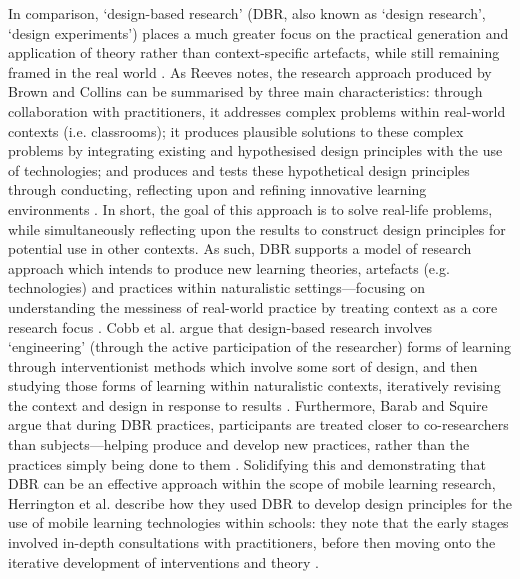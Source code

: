 In comparison, `design-based research' (DBR, also known as `design research', `design experiments') places a much greater focus on the practical generation and application of theory rather than context-specific artefacts, while still remaining framed in the real world \citep{zimmerman2007}. As Reeves notes, the research approach produced by Brown and Collins can be summarised by three main characteristics: through collaboration with practitioners, it addresses complex problems within real-world contexts (i.e. classrooms); it produces plausible solutions to these complex problems by integrating existing and hypothesised design principles with the use of technologies; and produces and tests these hypothetical design principles through conducting, reflecting upon and refining innovative learning environments \citep{reeves2000, brown1992, collins1992}. In short, the goal of this approach is to solve real-life problems, while simultaneously reflecting upon the results to construct design principles for potential use in other contexts. As such, DBR supports a model of research approach which intends to produce new learning theories, artefacts (e.g. technologies) and practices within naturalistic settings---focusing on understanding the messiness of real-world practice by treating context as a core research focus \citep{Barab2004}. Cobb et al. argue that design-based research involves `engineering' (through the active participation of the researcher) forms of learning through interventionist methods which involve some sort of design, and then studying those forms of learning within naturalistic contexts, iteratively revising the context and design in response to results \citep{cobb2003}. Furthermore, Barab and Squire argue that during DBR practices, participants are treated closer to co-researchers than subjects---helping produce and develop new practices, rather than the practices simply being done to them \citep{Barab2004}. Solidifying this and demonstrating that DBR can be an effective approach within the scope of mobile learning research, Herrington et al. describe how they used DBR to develop design principles for the use of mobile learning technologies within schools: they note that the early stages involved in-depth consultations with practitioners, before then moving onto the iterative development of interventions and theory \citep{herrington2009}.

